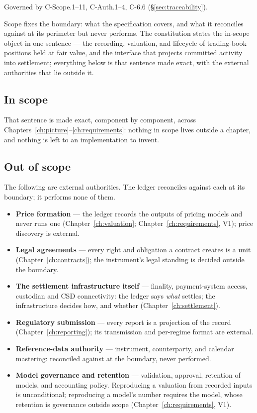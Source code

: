 \documentclass[11pt,a4paper]{article}
\begin{document}
Governed by C-Scope.1--11, C-Auth.1--4, C-6.6 (\S\ref{sec:traceability}).

Scope fixes the boundary: what the specification covers, and what it reconciles against
at its perimeter but never performs. The constitution states the in-scope object in one
sentence --- the recording, valuation, and lifecycle of trading-book positions held at
fair value, and the interface that projects committed activity into settlement; everything
below is that sentence made exact, with the external authorities that lie outside it.

\subsection{In scope}

That sentence is made exact, component by component, across
Chapters~\ref{ch:picture}--\ref{ch:requirements}: nothing in scope lives outside a chapter, and
nothing is left to an implementation to invent.

\subsection{Out of scope}

The following are external authorities. The ledger reconciles against each at its boundary;
it performs none of them.

\begin{itemize}[leftmargin=*, itemsep=2.5pt]
\item \textbf{Price formation} --- the ledger records the outputs of pricing models and
  never runs one (Chapter~\ref{ch:valuation}; Chapter~\ref{ch:requirements}, V1); price
  discovery is external.
\item \textbf{Legal agreements} --- every right and obligation a contract creates is a
  unit (Chapter~\ref{ch:contracts}); the instrument's legal standing is decided outside
  the boundary.
\item \textbf{The settlement infrastructure itself} --- finality, payment-system access,
  custodian and CSD connectivity: the ledger says \emph{what} settles; the infrastructure
  decides how, and whether (Chapter~\ref{ch:settlement}).
\item \textbf{Regulatory submission} --- every report is a projection of the record
  (Chapter~\ref{ch:reporting}); its transmission and per-regime format are external.
\item \textbf{Reference-data authority} --- instrument, counterparty, and calendar
  mastering: reconciled against at the boundary, never performed.
\item \textbf{Model governance and retention} --- validation, approval, retention of
  models, and accounting policy. Reproducing a valuation from recorded inputs is
  unconditional; reproducing a model's number requires the model, whose retention is
  governance outside scope (Chapter~\ref{ch:requirements}, V1).
\end{itemize}
\end{document}
